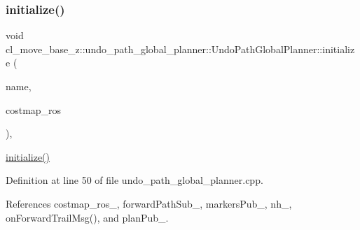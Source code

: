 \subsubsection{\texorpdfstring{initialize()}{initialize()}}
{\footnotesize\ttfamily void cl\+\_\+move\+\_\+base\+\_\+z\+::undo\+\_\+path\+\_\+global\+\_\+planner\+::\+Undo\+Path\+Global\+Planner\+::initialize (\begin{DoxyParamCaption}\item[{std\+::string}]{name,  }\item[{costmap\+\_\+2d\+::\+Costmap2\+D\+R\+OS $\ast$}]{costmap\+\_\+ros }\end{DoxyParamCaption})\hspace{0.3cm}{\ttfamily [override]}, {\ttfamily [virtual]}}

\hyperlink{classcl__move__base__z_1_1undo__path__global__planner_1_1UndoPathGlobalPlanner_a69e0fbb98872f108f679b2a6620638f5}{initialize()} 

Definition at line 50 of file undo\+\_\+path\+\_\+global\+\_\+planner.\+cpp.



References costmap\+\_\+ros\+\_\+, forward\+Path\+Sub\+\_\+, markers\+Pub\+\_\+, nh\+\_\+, on\+Forward\+Trail\+Msg(), and plan\+Pub\+\_\+.


